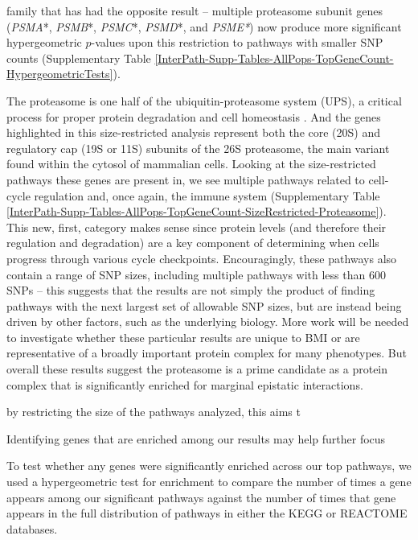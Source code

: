 \documentclass[12pt,a4paper]{article}
\begin{document}
family that has had the opposite result -- multiple proteasome subunit genes (\textit{PSMA}*, \textit{PSMB}*, \textit{PSMC}*, \textit{PSMD}*, and \textit{PSME*}) now produce more significant hypergeometric $p$-values upon this restriction to pathways with smaller SNP counts (Supplementary Table \ref{InterPath-Supp-Tables-AllPops-TopGeneCount-HypergeometricTests}). 

The proteasome is one half of the ubiquitin-proteasome system (UPS), a critical process for proper protein degradation and cell homeostasis \citep{Voges1999,Livneh2016,Collins2017}. And the genes highlighted in this size-restricted analysis represent both the core (20S) and regulatory cap (19S or 11S) subunits of the 26S proteasome, the main variant found within the cytosol of mammalian cells. Looking at the size-restricted pathways these genes are present in, we see multiple pathways related to cell-cycle regulation and, once again, the immune system (Supplementary Table \ref{InterPath-Supp-Tables-AllPops-TopGeneCount-SizeRestricted-Proteasome}). This new, first, category makes sense since protein levels (and therefore their regulation and degradation) are a key component of determining when cells progress through various cycle checkpoints. Encouragingly, these pathways also contain a range of SNP sizes, including multiple pathways with less than 600 SNPs -- this suggests that the results are not simply the product of finding pathways with the next largest set of allowable SNP sizes, but are instead being driven by other factors, such as the underlying biology. More work will be needed to investigate whether these particular results are unique to BMI or are representative of a broadly important protein complex for many phenotypes. But overall these results suggest the proteasome is a prime candidate as a protein complex that is significantly enriched for marginal epistatic interactions.  




by restricting the size of the pathways analyzed, this aims t 

Identifying genes that are enriched among our results may help further focus  






To test whether any genes were significantly enriched across our top pathways, we used a hypergeometric test for enrichment to compare the number of times a gene appears among our significant pathways against the number of times that gene appears in the full distribution of pathways in either the KEGG or REACTOME databases. 
\end{document}
